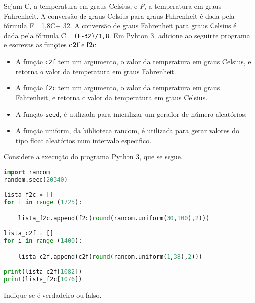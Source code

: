 \documentclass[12pt,varwidth=16cm,border=17pt]{standalone}
\begin{document}
Sejam C, a temperatura em graus Celsius, e \emph{F}, a temperatura em graus Fahrenheit. A conversão de graus Celsius para graus Fahrenheit é dada pela fórmula F= 1,8C+ 32. A conversão de graus Fahrenheit para graus Celsius é dada pela fórmula C= \verb+(F-32)/1,8+.
Em Pyhton 3, adicione ao seguinte programa e escrevas as funções \textbf{c2f} e \textbf{f2c} 


\begin{itemize}
    
  \item A função \verb+c2f+ tem um argumento, o valor da temperatura em graus Celsius, e retorna o valor da temperatura em graus Fahrenheit.
  
  \item  A função \verb+f2c+ tem um argumento, o valor da temperatura em graus Fahrenheit, e retorna o valor da temperatura em graus Celsius.

  \item A função \verb+seed+, é utilizada para inicializar um gerador de número aleatórios;
  
  \item A função uniform, da biblioteca random, é utilizada para gerar valores do tipo float aleatórios num intervalo especifico.

    
\end{itemize}




Considere a execução do programa Python 3, que se segue. 

\begin{lstlisting}[language=Python]
import random
random.seed(20340)

lista_f2c = []
for i in range (1725):

    lista_f2c.append(f2c(round(random.uniform(30,100),2)))

lista_c2f = []
for i in range (1400):

    lista_c2f.append(c2f(round(random.uniform(1,38),2)))

print(lista_c2f[1082])
print(lista_f2c[1076])
\end{lstlisting}

Indique se é verdadeiro ou falso.
\end{document}

